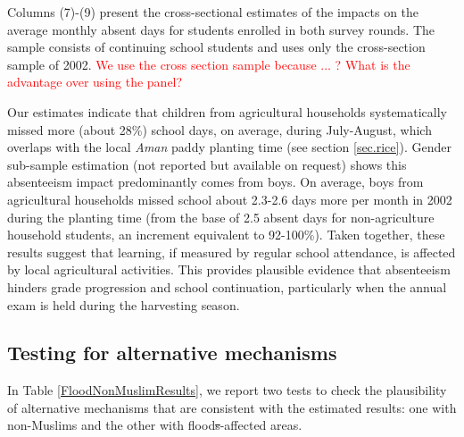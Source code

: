 \documentclass[12pt,letterpaper]{article}
\newcommand{\SAdded}[1]{\textcolor{red}{#1}}
\newcommand{\0}{\ensuremath{\mbox{\boldmath $0$}}}
\begin{document}
Columns (7)-(9) present the cross-sectional estimates of the impacts on the average monthly absent days for students enrolled in both survey rounds. The sample consists of continuing school students and uses only the cross-section sample of 2002. \SAdded{We use the cross section sample because ... ? What is the advantage over using the panel?}

Our estimates indicate that children from agricultural households systematically missed more (about 28\%) school days, on average, during July-August, which overlaps with the local \textit{Aman} paddy planting time (see section \ref{sec.rice}). Gender sub-sample estimation (not reported but available on request) shows this absenteeism impact predominantly comes from boys. On average, boys from agricultural households missed school about 2.3-2.6 days more per month in 2002 during the planting time (from the base of 2.5 absent days for non-agriculture household students, an increment equivalent to 92-100\%). Taken together, these results suggest that learning, if measured by regular school attendance, is affected by local agricultural activities. This provides plausible evidence that absenteeism hinders grade progression and school continuation, particularly when the annual exam is held during the harvesting season.





\subsection{Testing for alternative mechanisms}

In Table \ref{FloodNonMuslimResults}, we report two tests to check the plausibility of alternative mechanisms that are consistent with the estimated results: one with non-Muslims and the other with flood\sout{s}-affected areas. 
\end{document}
